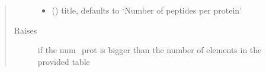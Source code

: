 \documentclass[letterpaper,10pt,english]{sphinxmanual}
\begin{document}
\begin{fulllineitems}
\begin{quote}
\begin{description}
\begin{itemize}
\item {} 
 (\sphinxstyleliteralemphasis{\sphinxupquote{, }}) \textendash{} title, defaults to ‘Number of peptides per protein’

\end{itemize}

\item[{Raises}] \leavevmode
{} \textendash{} if the num\_prot is bigger than the number of elements in the provided table

\end{description}\end{quote}

\end{fulllineitems}

\end{document}
